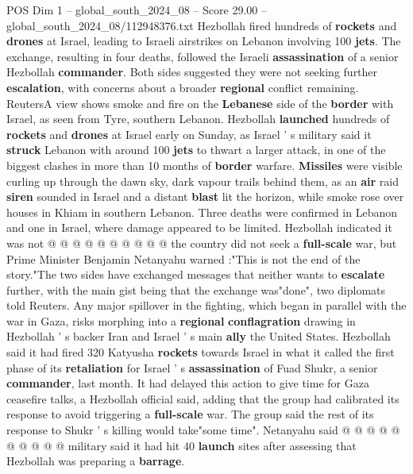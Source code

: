 \begin{textsample}{POS Dim 1 – global\_south\_2024\_08 – Score 29.00 – global\_south\_2024\_08/112948376.txt}  \label{ex:f1_pos_014}
Hezbollah fired hundreds of \textbf{rockets} and \textbf{drones} at Israel, leading to Israeli airstrikes on Lebanon involving 100 \textbf{jets}.
The exchange, resulting in four deaths, followed the Israeli \textbf{assassination} of a senior Hezbollah \textbf{commander}.
Both sides suggested they were not seeking further \textbf{escalation}, with concerns about a broader \textbf{regional} conflict remaining.
ReutersA view shows smoke and fire on the \textbf{Lebanese} side of the \textbf{border} with Israel, as seen from Tyre, southern Lebanon.
Hezbollah \textbf{launched} hundreds of \textbf{rockets} and \textbf{drones} at Israel early on Sunday, as Israel ' s military said it \textbf{struck} Lebanon with around 100 \textbf{jets} to thwart a larger attack, in one of the biggest clashes in more than 10 months of \textbf{border} warfare. \textbf{Missiles} were visible curling up through the dawn sky, dark vapour trails behind them, as an \textbf{air} raid \textbf{siren} sounded in Israel and a distant \textbf{blast} lit the horizon, while smoke rose over houses in Khiam in southern Lebanon.
Three deaths were confirmed in Lebanon and one in Israel, where damage appeared to be limited.
Hezbollah indicated it was not @ @ @ @ @ @ @ @ @ @ the country did not seek a \textbf{full-scale} war, but Prime Minister Benjamin Netanyahu warned :"This is not the end of the story."The two sides have exchanged messages that neither wants to \textbf{escalate} further, with the main gist being that the exchange was"done", two diplomats told Reuters.
Any major spillover in the fighting, which began in parallel with the war in Gaza, risks morphing into a \textbf{regional} \textbf{conflagration} drawing in Hezbollah ' s backer Iran and Israel ' s main \textbf{ally} the United States.
Hezbollah said it had fired 320 Katyusha \textbf{rockets} towards Israel in what it called the first phase of its \textbf{retaliation} for Israel ' s \textbf{assassination} of Fuad Shukr, a senior \textbf{commander}, last month.
It had delayed this action to give time for Gaza ceasefire talks, a Hezbollah official said, adding that the group had calibrated its response to avoid triggering a \textbf{full-scale} war.
The group said the rest of its response to Shukr ' s killing would take"some time".
Netanyahu said @ @ @ @ @ @ @ @ @ @ military said it had hit 40 \textbf{launch} sites after assessing that Hezbollah was preparing a \textbf{barrage}.

\end{textsample}
